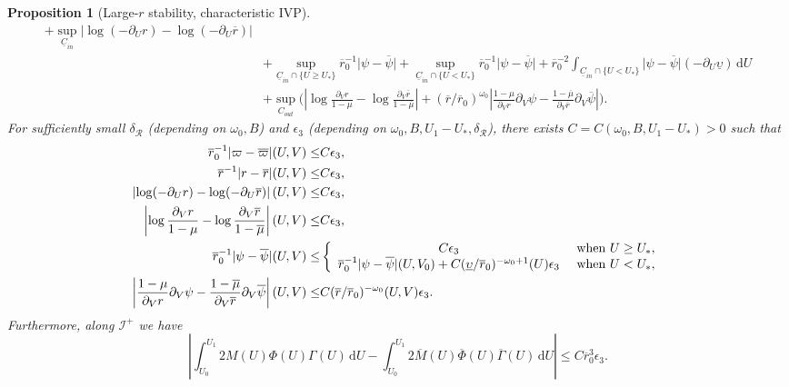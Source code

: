 \documentclass[10pt, reqno]{amsart}
\newtheorem{proposition}[theorem]{Proposition}
\theoremstyle{definition}
\theoremstyle{remark}
\theoremstyle{conjecture}
\numberwithin{equation}{section}
\newcommand{\abs}[1]{\vert#1\vert}
\newcommand{\set}[1]{\{#1\}}
\newcommand{\ud}{\mathrm{d}}
\newcommand{\rd}{\partial}
\newcommand{\0}{\emptyset}
\newcommand{\Gmm}{\Gamma}
\newcommand{\dlt}{\delta}
\newcommand{\eps}{\epsilon}
\newcommand{\omg}{\omega}
\newcommand{\ups}{\upsilon}
\newcommand{\calI}{\mathcal I}
\newcommand{\calR}{\mathcal R}
\newcommand{\uC}{\underline{C}}
\newcommand{\NI}{\calI^{+}}						%
\newcommand{\psibg}{\overline{\psi}}				%
\newcommand{\rbg}{\overline{r}}					%
\newcommand{\varpibg}{\overline{\varpi}}				%
\newcommand{\mubg}{\overline{\mu}}				%
\newcommand{\Abs}[1]{\left\vert #1 \right\vert}
\begin{document}
\begin{proposition}[Large-$r$ stability, characteristic IVP]
\begin{align*}
	 + \sup_{\uC_{in} } \Abs{\log (-\rd_{U} r) - \log (-\rd_{U} \rbg)} \\
	& +  \sup_{\uC_{in} \cap \set{U \geq U_{\ast}}} \rbg_{0}^{-1} \abs{\psi - \psibg}
	 + \sup_{\uC_{in} \cap \set{U < U_{\ast}}} \rbg_{0}^{-1} \abs{\psi - \psibg} 
	 + \rbg_{0}^{-2} \int_{\uC_{in} \cap \set{U < U_{\ast}}} \abs{\psi - \psibg} (- \rd_{U} \underline{\ups})  \, \ud U \\
	 & + \sup_{C_{out}} \bigg( 
	 \Abs{\log \frac{\rd_{V} r}{1-\mu} - \log \frac{\rd_{V} \rbg}{1-\mubg}} 
	 + (\rbg / \rbg_{0})^{\omg_0} \Abs{\frac{1-\mu}{\rd_{V} r}\rd_{V} \psi - \frac{1-\mubg}{\rd_{V} \rbg} \rd_{V} \psibg} \bigg) .
\end{align*}
For sufficiently small $\dlt_{\calR}$ (depending on $\omg_0, B$) and $\eps_{3}$ (depending on $\omg_0, B, U_{1} - U_{\ast}, \dlt_{\calR}$),  there exists $C = C(\omg_0, B, U_{1} - U_{\ast}) > 0$ such that 
\begin{equation} \label{eq:extr-st} 
\begin{aligned}
	\rbg_{0}^{-1} \abs{\varpi - \varpibg} (U, V) \leq & C \eps_{3}, \\
	\rbg^{-1} \abs{r - \rbg} (U, V) \leq & C \eps_{3}, \\
	\Abs{\log (-\rd_{U} r) - \log (-\rd_{U} \rbg)} (U, V) \leq & C \eps_{3}, \\
	\Abs{\log \frac{\rd_{V} r}{1-\mu} - \log \frac{\rd_{V} \rbg}{1-\mubg}} (U, V) \leq & C \eps_{3}, \\
	\rbg_{0}^{-1} \abs{\psi - \psibg} (U, V) \leq & \left\{
	\begin{array}{cl}
	C \eps_{3} & \hbox{ when } U \geq U_{\ast}, \\
	\rbg_{0}^{-1}\abs{\psi - \psibg}(U, V_{0}) + C (\underline{\ups} / \rbg_{0})^{-\omg_0+1} (U)  \eps_{3} & \hbox{ when } U < U_{\ast}, \\
	\end{array} \right. \\
	\Abs{\frac{1-\mu}{\rd_{V} r} \rd_{V} \psi - \frac{1-\mubg}{\rd_{V} \rbg} \rd_{V} \psibg} (U, V) \leq & C (\rbg / \rbg_{0})^{-\omg_0} (U, V) \eps_{3} .	
\end{aligned}
\end{equation}
Furthermore, along $\NI$ we have
\begin{equation} \label{eq:extr-st:L}
	\Abs{\int_{U_{0}}^{U_{1}} 2 M(U) \Phi(U) \Gmm(U) \, \ud U - \int_{U_{0}}^{U_{1}} 2 \overline{M}(U) \overline{\Phi}(U) \overline{\Gmm}(U) \, \ud U} \leq C \rbg_{0}^{3} \eps_{3}.
\end{equation}
\end{proposition}  
\end{document}
